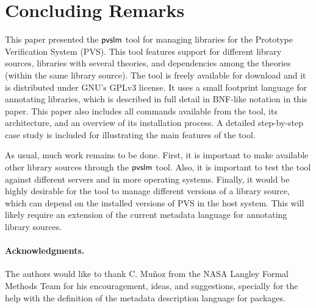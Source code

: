 \section{Concluding Remarks}
\label{sec.concl}

This paper presented the $\textsf{pvslm}$ tool for managing libraries for the
Prototype Verification System (PVS). This tool features support for
different library sources, libraries with several theories, and
dependencies among the theories (within the same library source).  The
tool is freely available for download and it is distributed under
GNU's GPLv3 license. It uses a small footprint language for
annotating libraries, which is described in full detail in BNF-like
notation in this paper. This paper also includes all commands
available from the tool, its architecture, and an overview of its
installation process.  A detailed step-by-step case study is included
for illustrating the main features of the tool.

As usual, much work remains to be done. First, it is important to make
available other library sources through the $\textsf{pvslm}$ tool.  Also, it
is important to test the tool against different servers and in more
operating systems. Finally, it would be highly desirable for the tool
to manage different versions of a library source, which can depend on
the installed versions of PVS in the host system. This will likely
require an extension of the current metadata language for annotating
library sources.

\paragraph{\bf Acknowledgments.} The authors would like to thank
C. Mu\~noz from the NASA Langley Formal Methods Team for his
encouragement, ideas, and suggestions, specially for the help with the
definition of the metadata description language for packages.
